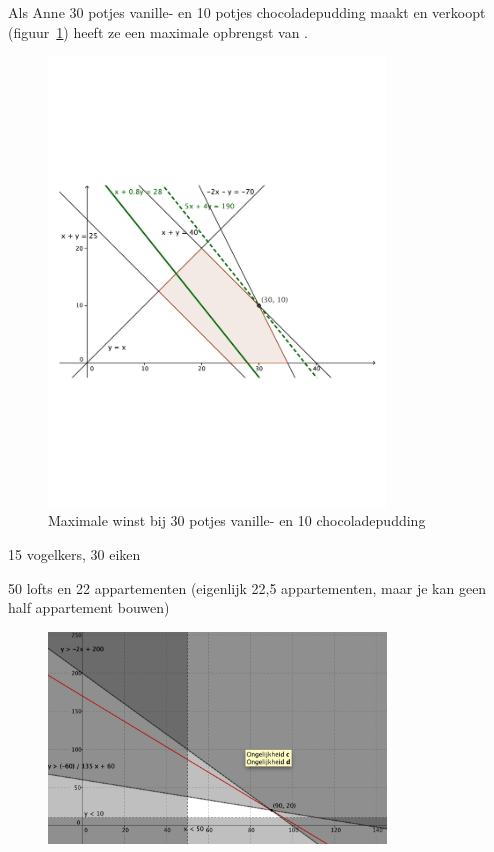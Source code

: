 \begin{Oplossing}{4.12}
Als Anne 30 potjes vanille- en 10 potjes chocoladepudding maakt en verkoopt (figuur~\ref{fig:pudding}) heeft ze een maximale opbrengst van .
\begin{figure}[hbtp]
\centering
\includegraphics[width=0.8\textwidth]{oefeningen/FigurenLP/Oefpudding.pdf}
\caption{Maximale winst bij 30 potjes vanille- en 10 chocoladepudding}
\label{fig:pudding}
\end{figure}
\end{Oplossing}
\begin{Oplossing}{4.13}
15 vogelkers, 30 eiken
\end{Oplossing}
\begin{Oplossing}{4.14}
50 lofts en 22 appartementen (eigenlijk 22,5 appartementen, maar je kan geen half appartement bouwen)
\begin{figure}[htb]
\centering
\includegraphics[width=0.8\textwidth]{oefeningen/FigurenLP/lofts}
\end{figure}
\end{Oplossing}
